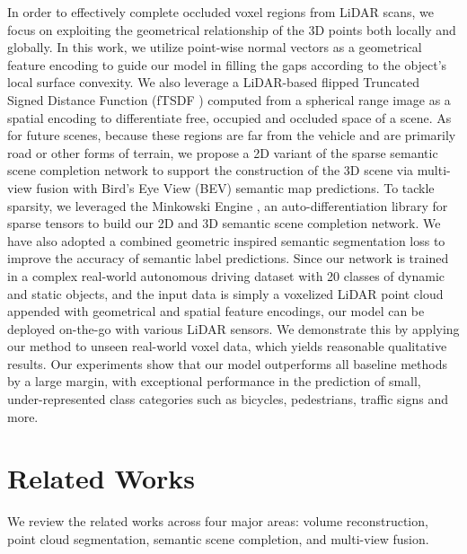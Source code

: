 \documentclass{article}
\begin{document}
In order to effectively complete occluded voxel regions from LiDAR scans, we focus on exploiting the geometrical relationship of the 3D points both locally and globally. In this work, we utilize point-wise normal vectors as a geometrical feature encoding to guide our model in filling the gaps according to the object's local surface convexity. We also leverage a LiDAR-based flipped Truncated Signed Distance Function (fTSDF \cite{song2017semantic}) computed from a spherical range image as a spatial encoding to differentiate free, occupied and occluded space of a scene. As for future scenes, because these regions are far from the vehicle and are primarily road or other forms of terrain, we propose a 2D variant of the sparse semantic scene completion network to support the construction of the 3D scene via multi-view fusion with Bird's Eye View (BEV) semantic map predictions. To tackle sparsity, we leveraged the Minkowski Engine \cite{choy20194d}, an auto-differentiation library for sparse tensors to build our 2D and 3D semantic scene completion network. We have also adopted a combined geometric inspired semantic segmentation loss to improve the accuracy of semantic label predictions. Since our network is trained in a complex real-world autonomous driving dataset with 20 classes of dynamic and static objects, and the input data is simply a voxelized LiDAR point cloud appended with geometrical and spatial feature encodings, our model can be deployed on-the-go with various LiDAR sensors. We demonstrate this by applying our method to unseen real-world voxel data, which yields reasonable qualitative results. Our experiments show that our model outperforms all baseline methods by a large margin, with exceptional performance in the prediction of small, under-represented class categories such as bicycles, pedestrians, traffic signs and more.





\section{Related Works}
\label{sec:related_works}
We review the related works across four major areas: volume reconstruction, point cloud segmentation, semantic scene completion, and multi-view fusion.
\end{document}
